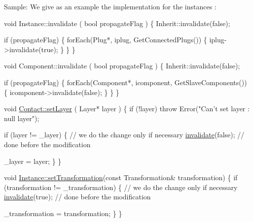 \begin{DoxyParagraph}{Sample\+:}
We give as an example the implementation for the instances \+: 
\begin{DoxyCode}
\textcolor{keywordtype}{void} Instance::invalidate ( \textcolor{keywordtype}{bool} propagateFlag )
\{
  Inherit::invalidate(\textcolor{keyword}{false});
 
  \textcolor{keywordflow}{if} (propagateFlag) \{
    forEach(Plug*, iplug, GetConnectedPlugs()) \{
      iplug->invalidate(\textcolor{keyword}{true});
    \}
  \}
\}
\end{DoxyCode}
 
\begin{DoxyCode}
\textcolor{keywordtype}{void} Component::invalidate ( \textcolor{keywordtype}{bool} propagateFlag )
\{
  Inherit::invalidate(\textcolor{keyword}{false});
 
  \textcolor{keywordflow}{if} (propagateFlag) \{
    forEach(Component*, icomponent, GetSlaveComponents()) \{
      icomponent->invalidate(\textcolor{keyword}{false});
    \}
  \}
\}
\end{DoxyCode}
 
\begin{DoxyCode}
\textcolor{keywordtype}{void} \hyperlink{classHurricane_1_1Contact_a147644849f33bc4d58b6b997543c8306}{Contact::setLayer} ( Layer* layer )
\{
  \textcolor{keywordflow}{if} (!layer) \textcolor{keywordflow}{throw} Error(\textcolor{stringliteral}{"Can't set layer : null layer"});
 
  \textcolor{keywordflow}{if} (layer != \_layer) \{
    \textcolor{comment}{// we do the change only if necessary}
    \hyperlink{classHurricane_1_1Go_a5ee451e118fe8cace16989c0f3a6d855}{invalidate}(\textcolor{keyword}{false}); \textcolor{comment}{// done before the modification}
 
    \_layer = layer;
  \}
\}
\end{DoxyCode}
 
\begin{DoxyCode}
\textcolor{keywordtype}{void} \hyperlink{classHurricane_1_1Instance_a8890d2e1b2ba2542997454297e63512f}{Instance::setTransformation}(\textcolor{keyword}{const} Transformation& transformation)
\{
  \textcolor{keywordflow}{if} (transformation != \_transformation) \{
    \textcolor{comment}{// we do the change only if necessary}
    \hyperlink{classHurricane_1_1Go_a5ee451e118fe8cace16989c0f3a6d855}{invalidate}(\textcolor{keyword}{true}); \textcolor{comment}{// done before the modification}

    \_transformation = transformation;
  \}
\}
\end{DoxyCode}
 
\end{DoxyParagraph}


